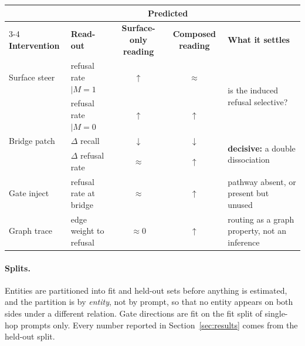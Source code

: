 \documentclass{article}
\begin{document}
\begin{center}
\small
{}
\label{tab:causal}
\vspace{1pt}
\begin{tabular}{@{}llccl@{}}
\toprule
& & \multicolumn{2}{c}{\textbf{Predicted}} &\\
\cmidrule(lr){3-4}
\textbf{Intervention} & \textbf{Read-out} & \textbf{Surface-only reading} & \textbf{Composed reading} & \textbf{What it settles}\\
\midrule
Surface steer    & refusal rate $\mid M{=}1$ & $\uparrow$   & $\approx$    & \multirow{2}{*}{is the induced refusal selective?}\\
                 & refusal rate $\mid M{=}0$ & $\uparrow$   & $\uparrow$   & \\
\addlinespace[3pt]
Bridge patch     & $\Delta$ recall           & $\downarrow$ & $\downarrow$ & \multirow{2}{*}{\textbf{decisive:} a double dissociation}\\
                 & $\Delta$ refusal rate     & $\approx$    & $\uparrow$   & \\
\addlinespace[3pt]
Gate inject      & refusal rate at bridge    & $\approx$    & $\uparrow$   & pathway absent, or present but unused\\
\addlinespace[3pt]
Graph trace      & edge weight to refusal    & $\approx 0$  & $\uparrow$   & routing as a graph property, not an inference\\
\bottomrule
\end{tabular}
\vspace{-1.15em}
\end{center}

\paragraph{Splits.} Entities are partitioned into fit and held-out sets before anything is estimated,
and the partition is by \emph{entity}, not by prompt, so that no entity appears on both sides under a
different relation. Gate directions are fit on the fit split of single-hop prompts only. Every number
reported in Section~\ref{sec:results} comes from the held-out split.
\end{document}
